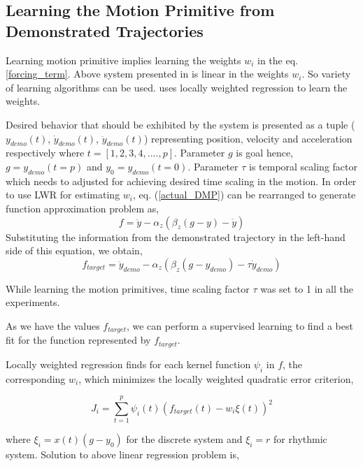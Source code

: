 \subsection{Learning the Motion Primitive from Demonstrated Trajectories}
\par Learning motion primitive implies learning the weights $w_{i}$ in the eq. \ref{forcing_term}. Above system presented in \cite{ijspeert2013dynamical} is linear in the weights $w_{i}$. So variety of learning algorithms can be used. \cite{ijspeert2013dynamical} uses locally weighted regression to learn the weights. 

Desired behavior that should be exhibited by the system is presented as a tuple ($y_{demo}(t)$, $\dot{y}_{demo}(t)$, $\ddot{y}_{demo}(t)$) representing position, velocity and acceleration respectively where $t = [1,2,3,4,....,p]$. Parameter $g$ is goal hence, $g = y_{demo}(t = p)$ and $y_{0} = y_{demo}(t = 0)$. Parameter $\tau$ is temporal scaling factor which needs to adjusted for achieving desired time scaling in the motion. In order to use LWR for estimating $w_{i}$, eq. (\ref{actual_DMP}) can be rearranged to generate function approximation problem as,
\begin{equation}
f = \ddot{y} - \alpha_{z}(\beta_{z}(g - y) - \dot{y})
\end{equation}
Substituting the information from the demonstrated trajectory in the left-hand side of this equation, we obtain,
\begin{equation}
f_{target} = \ddot{y}_{demo} - \alpha_{z}(\beta_{z}(g - y_{demo}) - \tau\dot{y}_{demo})
\end{equation}

While learning the motion primitives, time scaling factor $\tau$ was set to 1 in all the experiments. 

As we have the values $f_{target}$, we can perform a supervised learning to find a best fit for the function represented by $f_{target}$. 

Locally weighted regression finds for each kernel function $\psi_{i}$ in $f$, the
corresponding $w_{i}$, which minimizes the locally weighted quadratic error criterion,

\begin{equation}
	J_{i} = \sum_{t=1}^{p}\psi_{i}(t)(f_{target}(t)-w_{i}\xi(t))^{2}
\end{equation}

where $\xi_{i} = x(t)(g-y_{0})$ for the discrete system and $\xi_{i} = r$ for rhythmic system. Solution to above linear regression problem is,

